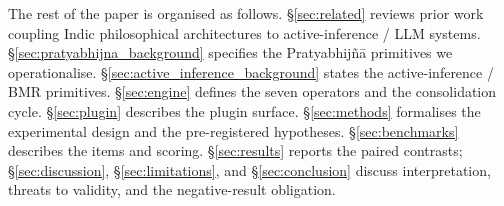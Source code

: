 The rest of the paper is organised as follows. \S\ref{sec:related} reviews prior work coupling Indic philosophical architectures to active-inference / LLM systems. \S\ref{sec:pratyabhijna_background} specifies the Pratyabhij\~n\=a primitives we operationalise. \S\ref{sec:active_inference_background} states the active-inference / BMR primitives. \S\ref{sec:engine} defines the seven operators and the consolidation cycle. \S\ref{sec:plugin} describes the plugin surface. \S\ref{sec:methods} formalises the experimental design and the pre-registered hypotheses. \S\ref{sec:benchmarks} describes the items and scoring. \S\ref{sec:results} reports the paired contrasts; \S\ref{sec:discussion}, \S\ref{sec:limitations}, and \S\ref{sec:conclusion} discuss interpretation, threats to validity, and the negative-result obligation.
